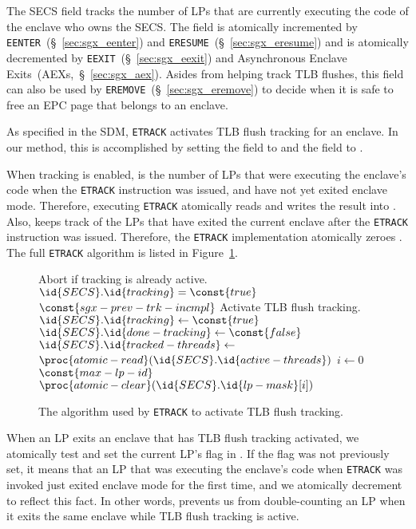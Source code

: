 The  SECS field tracks the number of LPs that are currently
executing the code of the enclave who owns the SECS. The field is atomically
incremented by \texttt{EENTER}~(\S~\ref{sec:sgx_eenter}) and
\texttt{ERESUME}~(\S~\ref{sec:sgx_eresume}) and is atomically decremented by
\texttt{EEXIT}~(\S~\ref{sec:sgx_eexit}) and Asynchronous Enclave
Exits~(AEXs,~\S~\ref{sec:sgx_aex}). Asides from helping track TLB flushes, this
field can also be used by \texttt{EREMOVE}~(\S~\ref{sec:sgx_eremove}) to decide
when it is safe to free an EPC page that belongs to an enclave.

As specified in the SDM, \texttt{ETRACK} activates TLB flush tracking for an
enclave. In our method, this is accomplished by setting the  field
to  and the  field to .

When tracking is enabled,  is the number of LPs that were
executing the enclave's code when the \texttt{ETRACK} instruction was issued,
and have not yet exited enclave mode. Therefore, executing \texttt{ETRACK}
atomically reads  and writes the result into
. Also,  keeps track of the LPs that have
exited the current enclave after the \texttt{ETRACK} instruction was issued.
Therefore, the \texttt{ETRACK} implementation atomically zeroes .
The full \texttt{ETRACK} algorithm is listed in
Figure~\ref{fig:sgx_tracking_etrack}.

\begin{figure}[hbt]
  \begin{codebox}
  \zi \Comment Abort if tracking is already active.
  \li \If $\id{SECS}.\id{tracking} = \const{true}$
  \li   \Then \Return $\const{sgx-prev-trk-incmpl}$
        \End
  \zi \Comment Activate TLB flush tracking.
  \li $\id{SECS}.\id{tracking} \gets \const{true}$
  \li $\id{SECS}.\id{done-tracking} \gets \const{false}$
  \li $\id{SECS}.\id{tracked-threads} \gets$
      \Indentmore
  \zi $\proc{atomic-read}(\id{SECS}.\id{active-threads})$
      \End
  \li \For $i \gets 0$ \To $\const{max-lp-id}$
  \li   \Do
          $\proc{atomic-clear}(\id{SECS}.\id{lp-mask}[i])$
        \End
  \end{codebox}
  \caption{
    The algorithm used by \texttt{ETRACK} to activate TLB flush tracking.
  }
  \label{fig:sgx_tracking_etrack}
\end{figure}

When an LP exits an enclave that has TLB flush tracking activated, we
atomically test and set the current LP's flag in . If the flag was
not previously set, it means that an LP that was executing the enclave's code
when \texttt{ETRACK} was invoked just exited enclave mode for the first time,
and we atomically decrement  to reflect this fact. In other
words,  prevents us from double-counting an LP when it exits the
same enclave while TLB flush tracking is active.

